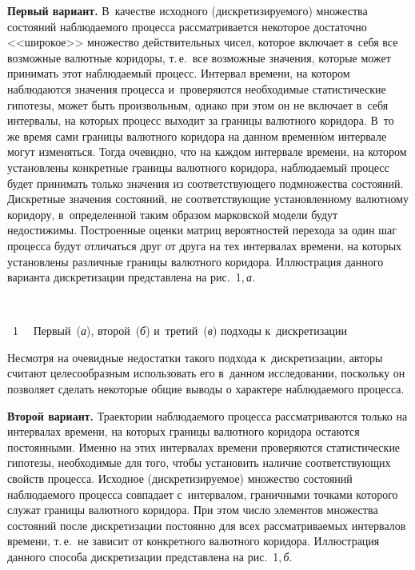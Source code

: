 \begin{multicols}{2}
  \textbf{Первый вариант.} В~качестве исходного (дискретизируемого) 
множества состояний наблюдаемого процесса рассматривается некоторое 
достаточно <<широкое>> множество действительных чисел, которое включает 
в~себя все возможные валютные коридоры, т.\,е.\ все возможные значения, 
которые может принимать этот наблюдаемый процесс. Интервал времени, на 
котором наблюдаются значения процесса и~проверяются необходимые 
статистические гипотезы, может быть произвольным, однако при этом он не 
включает в~себя интервалы, на которых процесс выходит за границы валютного 
коридора. В~то же время сами границы валютного коридора на данном 
временн$\acute{\mbox{о}}$м интервале могут изменяться. Тогда очевидно, что на каждом 
интервале времени, на котором установлены конкретные границы валютного 
коридора, наблюдаемый процесс будет принимать только значения из 
соответствующего подмножества состояний. Дискретные значения состояний, 
не соответствующие установленному валютному коридору, в~определенной 
таким образом марковской модели будут недостижимы. Построенные оценки 
матриц вероятностей перехода за один шаг процесса будут отличаться друг от 
друга на тех интервалах времени, на которых установлены различные границы 
валютного коридора. Иллюстрация данного варианта дискретизации 
представлена на рис.~1,\,\textit{а}.



 

{ \begin{center}  %
 \vspace*{-1pt}
    \mbox{%
\epsfxsize=79.101mm
}


\end{center}

\noindent
{{\figurename~1}\ \ \small{
Первый~(\textit{а}), второй~(\textit{б}) и~третий~(\textit{в}) подходы к~дискретизации
}}}

\vspace*{18pt}

\addtocounter{figure}{1}
  

\noindent
 Несмотря на очевидные недостатки такого подхода к~дискретизации, авторы 
считают целесообразным использовать его в~данном исследовании, поскольку 
он позволяет сделать некоторые общие выводы о характере наблюдаемого 
процесса.

\smallskip
  
  \textbf{Второй вариант.} Траектории наблюдаемого процесса 
рассматриваются только на интервалах времени, на которых границы 
валютного коридора остаются постоянными. Именно на этих интервалах 
времени проверяются статистические гипотезы, необходимые для того, чтобы 
установить наличие соответствующих свойств процесса. Исходное 
(дискретизируемое) множество состояний наблюдаемого процесса совпадает 
с~интервалом, граничными точками которого служат границы валютного 
коридора. При этом число элементов множества состояний после 
дискретизации постоянно для всех рассматриваемых интервалов времени, т.\,е.\ 
не зависит от конкретного валютного коридора. Иллюстрация данного способа 
дискретизации пред\-став\-ле\-на на рис.~1,\,\textit{б}.


\end{multicols}
